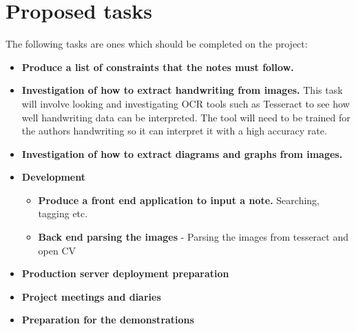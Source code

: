 \documentclass[11pt,fleqn,twoside]{article}
\begin{document}
\section{Proposed tasks}
The following tasks are ones which should be completed on the project:
\begin{itemize}
\item \textbf{Produce a list of constraints that the notes must follow.}

\item \textbf{Investigation of how to extract handwriting from images.} This task will involve looking and investigating OCR tools such as Tesseract to see how well handwriting data can be interpreted. The tool will need to be trained for the authors handwriting so it can interpret it with a high accuracy rate.

\item \textbf{Investigation of how to extract diagrams and graphs from images.}

\item \textbf{Development}
  \begin{itemize}

    \item \textbf{Produce a front end application to input a note.} Searching, tagging etc.

    \item \textbf{Back end parsing the images} - Parsing the images from tesseract and open CV

  \end{itemize}

\item \textbf{Production server deployment preparation}

\item \textbf{Project meetings and diaries}

\item \textbf{Preparation for the demonstrations}

\end{itemize}

\end{document}
